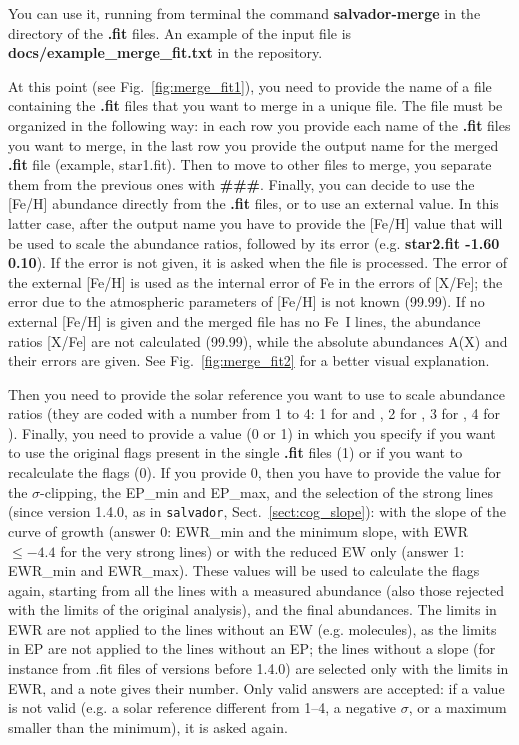 \documentclass[modern]{aastex701}
\begin{document}
You can use it, running from terminal the command {\bf salvador-merge} in the directory of the {\bf .fit} files. An example of the input file is {\bf docs/example\_merge\_fit.txt} in the repository. 

At this point (see Fig.~\ref{fig:merge_fit1}), you need to provide the name of a file containing the {\bf .fit} files that you want to merge in a unique file. 
The file must be organized in the following way: in each row you provide each name of the {\bf .fit} files you want to merge, in the last row you provide the output name for the merged {\bf .fit} file (example, star1.fit). Then to move to other files to merge, you separate them from the previous ones with {\bf \#\#\#}.
Finally, you can decide to use the [Fe/H] abundance directly from the {\bf .fit} files, or to use an external value. In this latter case, after the output name you have to provide the [Fe/H] value that will be used to scale the abundance ratios, followed by its error (e.g. {\bf star2.fit  -1.60  0.10}). If the error is not given, it is asked when the file is processed. The error of the external [Fe/H] is used as the internal error of Fe in the errors of [X/Fe]; the error due to the atmospheric parameters of [Fe/H] is not known (99.99). If no external [Fe/H] is given and the merged file has no Fe~I lines, the abundance ratios [X/Fe] are not calculated (99.99), while the absolute abundances A(X) and their errors are given.
See Fig.~\ref{fig:merge_fit2} for a better visual explanation.

Then you need to provide the solar reference you want to use to scale abundance ratios (they are coded with a number from 1 to 4: 1 for \citet{caffau_11} and \citet{lodders_10}, 2 for \citet{grevesse_98}, 3 for \citet{magg_22}, 4 for \citet{asplund_09}).
Finally, you need to provide a value (0 or 1) in which you specify if you want to use the original flags present in the single {\bf .fit} files (1) or if you want to recalculate the flags (0).
If you provide 0, then you have to provide the value for the $\sigma$-clipping, the EP\_min and EP\_max, and the selection of the strong lines (since version 1.4.0, as in \texttt{salvador}, Sect.~\ref{sect:cog_slope}): with the slope of the curve of growth (answer 0: EWR\_min and the minimum slope, with EWR $\le -4.4$ for the very strong lines) or with the reduced EW only (answer 1: EWR\_min and EWR\_max). These values will be used to calculate the flags again, starting from all the lines with a measured abundance (also those rejected with the limits of the original analysis), and the final abundances. The limits in EWR are not applied to the lines without an EW (e.g. molecules), as the limits in EP are not applied to the lines without an EP; the lines without a slope (for instance from .fit files of versions before 1.4.0) are selected only with the limits in EWR, and a note gives their number. Only valid answers are accepted: if a value is not valid (e.g. a solar reference different from 1--4, a negative $\sigma$, or a maximum smaller than the minimum), it is asked again.
\end{document}
